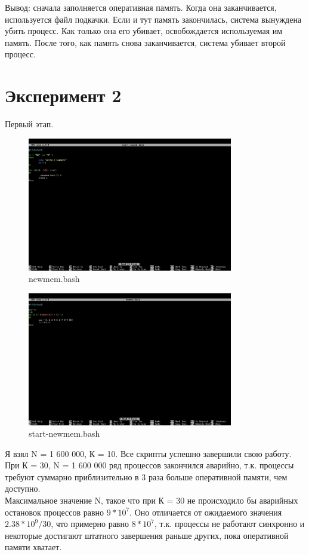 \documentclass{article}
\begin{document}
Вывод: сначала заполняется оперативная память. Когда она заканчивается, используется файл подкачки. Если и тут память закончилась, система вынуждена убить процесс. Как только она его убивает, освобождается используемая им память. После того, как память снова заканчивается, система убивает второй процесс. 

\section*{Эксперимент 2}

Первый этап. 

\begin{figure}[H]
\centering
\includegraphics[width=0.8\textwidth]{images/9.png}
\caption{newmem.bash}
\end{figure}

\begin{figure}[H]
\centering
\includegraphics[width=0.8\textwidth]{images/10.png}
\caption{start-newmem.bash}
\end{figure}

Я взял N = 1 600 000, К = 10. Все скрипты успешно завершили свою работу.\\  

При К = 30, N = 1 600 000 ряд процессов закончился аварийно, т.к. процессы требуют суммарно приблизительно в 3 раза больше оперативной памяти, чем доступно. \\

Максимальное значение N, такое что при К = 30 не происходило бы аварийных остановок процессов равно $9 * 10^7$. Оно отличается от ожидаемого значения $2.38 * 10^9 / 30$, что примерно равно $8 * 10^7$, т.к. процессы не работают синхронно и некоторые достигают штатного завершения раньше других, пока оперативной памяти хватает. 
\end{document}
